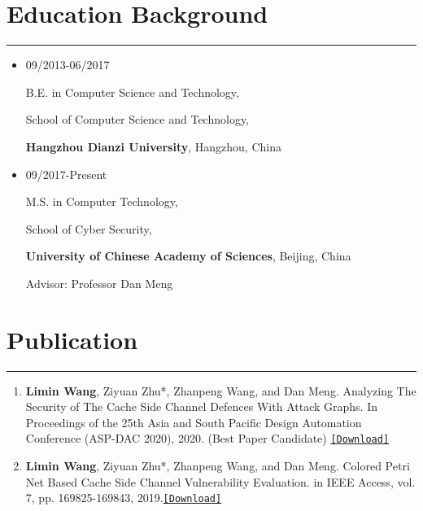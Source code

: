 \documentclass[11pt]{article}
\begin{document}
\section*{Education Background}
\vspace{-0.6cm}
\rule[0.1pt]{\textwidth}{1pt}
\begin{itemize}
\item 09/2013-06/2017

B.E. in Computer Science and Technology,

School of Computer Science and Technology,

{\bf Hangzhou Dianzi University}, Hangzhou, China 


\item 09/2017-Present 

M.S. in Computer Technology, 

School of Cyber Security,

{\bf University of Chinese Academy of Sciences}, Beijing, China

Advisor: { Professor  Dan Meng}
\end{itemize}
%
%

\section*{Publication} \label{paper}
\vspace{-0.6cm}
\rule[0.1pt]{\textwidth}{1pt}
\begin{enumerate}	
	\item {\bf Limin Wang}, Ziyuan Zhu*, Zhanpeng Wang, and Dan Meng. Analyzing The Security of The Cache Side Channel Defences With Attack Graphs. In Proceedings of the 25th Asia and South Pacific Design Automation Conference (ASP-DAC 2020), 2020. {\color{red}(Best Paper Candidate)} \href{http://csuncle.com/uploads/About/ASPDAC2020-final.pdf}{\tt [Download]}
	
	\item {\bf Limin Wang}, Ziyuan Zhu*, Zhanpeng Wang, and Dan Meng. Colored Petri Net Based Cache Side Channel Vulnerability Evaluation. in IEEE Access, vol. 7, pp. 169825-169843, 2019.\hspace{0.9cm}\href{http://csuncle.com/uploads/About/IEEE-Access-Print.pdf}{\tt [Download]}
	
\end{enumerate}
\end{document}
